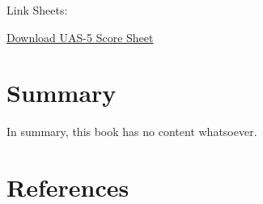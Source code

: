 \documentclass[
  letterpaper,
  DIV=11,
  numbers=noendperiod]{scrreprt}
\begin{document}
Link Sheets:

\href{UAS-5_Skor.xlsx}{Download UAS-5 Score Sheet}


\chapter{Summary}\label{summary}

In summary, this book has no content whatsoever.


\chapter*{References}\label{references}


\label{refs}
\end{document}

